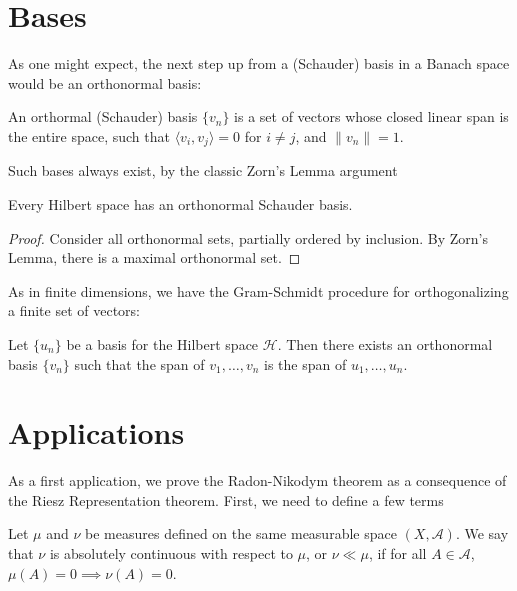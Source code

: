 \documentclass[twoside,symmetric, openany, 12pt]{./tuftebook}
\theoremstyle{definition}
\theoremstyle{definition}
\theoremstyle{definition}
\begin{document}
\section{Bases}
As one might expect, the next step up from a (Schauder) basis in a Banach space would be an orthonormal basis:
\begin{Definition}
	An orthormal (Schauder) basis $\{v_n\}$ is a set of vectors whose closed linear span is the entire space, such that $\langle v_i, v_j\rangle =0$ for $i\neq j$, and $\|v_n\| = 1$.
\end{Definition}
Such bases always exist, by the classic Zorn's Lemma argument
\begin{Theorem}
	Every Hilbert space has an orthonormal Schauder basis.
\end{Theorem}
\begin{proof}
	Consider all orthonormal sets, partially ordered by inclusion. By Zorn's Lemma, there is a maximal orthonormal set. 
\end{proof}
As in finite dimensions, we have the Gram-Schmidt procedure for orthogonalizing a finite set of vectors:
\begin{Theorem}
	Let $\{u_n\}$ be a basis for the Hilbert space $\mathcal{H}$. Then there exists an orthonormal basis $\{v_n\}$ such that the span of $v_1, \dots, v_n$ is the span of $u_1, \dots, u_n$.
\end{Theorem}
\section{Applications}
As a first application, we prove the Radon-Nikodym theorem as a consequence of the Riesz Representation theorem. First, we need to define a few terms

\begin{Definition}
	Let $\mu$ and $\nu$ be measures defined on the same measurable space $(X, \mathcal{A})$. We say that $\nu$ is absolutely continuous with respect to $\mu$, or $\nu \ll \mu$, if for all $A\in \mathcal{A}$, $\mu(A)=0\implies \nu(A)=0$.
\end{Definition}
\end{document}

